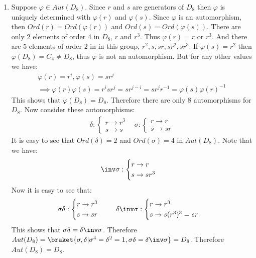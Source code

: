 \begin{enumerate}[label=]
    \item 
        Suppose $\varphi \in Aut(D_8)$. Since $r$ and $s$ are generators of $D_8$ then $\varphi$ is uniquely determined with $\varphi(r)$ and $\varphi(s)$. Since $\varphi$ is an automorphism, then $Ord(r) = Ord(\varphi(r))$ and $Ord(s) = Ord(\varphi(s))$. There are only 2 elements of order 4 in $D_8$, $r$ and $r^3$. Thus $\varphi(r) = r$ or $r^3$. And there are 5 elements of order 2 in in this group, $r^2, s, sr, sr^2, sr^3$. If $\varphi(s) = r^2$ then $\varphi(D_8) = C_4 \ne D_8$, thus $\varphi$ is not an automorphism. But for any other values we have:
        \begin{gather*}
            \varphi(r) = r^i, \varphi(s) = sr^j \\
            \implies \varphi(r) \varphi(s) = r^i sr^j = s r^{j - i} = sr^j r^{-1} = \varphi(s) \varphi(r)^{-1}
        \end{gather*}
        This shows that $\varphi(D_8) = D_8$. Therefore there are only 8 automorphisms for $D_8$. Now consider these automorphisms:
        \begin{gather*}
            \delta: \begin{cases}
                r \to r^3 \\
                s \to s
            \end{cases}\ \ \ \
            \sigma: \begin{cases}
                r \to r \\
                s \to sr
            \end{cases}
        \end{gather*}
        It is easy to see that $Ord(\delta)=2$ and $Ord(\sigma) = 4$ in $Aut(D_8)$. Note that we have: 
        \begin{gather*}
            \inv \sigma: \begin{cases}
                r \to r \\
                s \to sr^3
            \end{cases}
        \end{gather*}
        Now it is easy to see that:
        \begin{gather*}
            \sigma \delta: \begin{cases}
                r \to r^3 \\
                s \to sr
            \end{cases} \ \ \ \ 
            \delta \inv \sigma: \begin{cases}
                r \to r^3 \\
                s \to s(r^3)^3 = sr
            \end{cases}
        \end{gather*}
        This shows that $\sigma \delta = \delta \inv \sigma$. Therefore $Aut(D_8) = \braket{\sigma, \delta| \sigma^4 = \delta^2 = 1, \sigma \delta = \delta \inv \sigma} = D_8$. Therefore $Aut(D_8) = D_8$.
\end{enumerate}